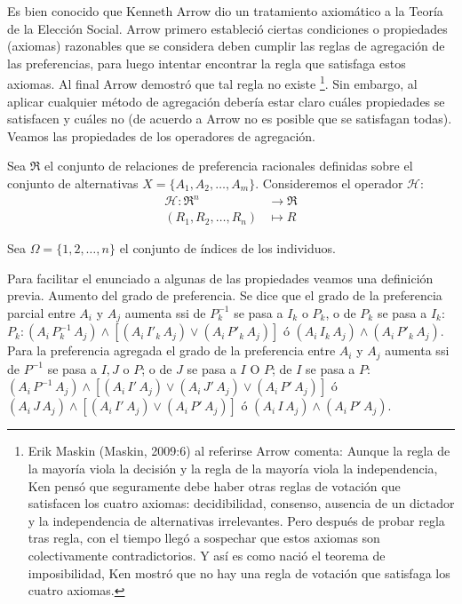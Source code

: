 \documentclass[a5paper,doc,10pt,noapacite]{apa6}
\begin{document}
{{Es bien conocido que Kenneth Arrow dio un tratamiento axiomático a la Teoría de la Elección Social. Arrow primero estableció ciertas condiciones o propiedades (axiomas) razonables que se considera deben cumplir las reglas de agregación de las preferencias, para luego intentar encontrar la regla que satisfaga estos axiomas. Al final Arrow demostró que tal regla no existe \footnote{Erik Maskin (Maskin, 2009:6) al referirse Arrow comenta: Aunque la regla de la mayoría viola la decisión y la regla de la mayoría viola la independencia, Ken pensó que seguramente debe haber otras reglas de votación que satisfacen los cuatro axiomas: decidibilidad, consenso, ausencia de un dictador y la independencia de alternativas irrelevantes. Pero después de probar regla tras regla, con el tiempo llegó a sospechar que estos axiomas son colectivamente contradictorios. Y así es como nació el teorema de imposibilidad, Ken mostró que no hay una regla de votación que satisfaga los cuatro axiomas.}. Sin embargo, al aplicar cualquier método de agregación debería estar claro cuáles propiedades se satisfacen y cuáles no (de acuerdo a Arrow no es posible que se satisfagan todas). Veamos las propiedades de los operadores de agregación.

\vspace{1\baselineskip}
Sea \(\Re\) el conjunto de relaciones de preferencia racionales definidas sobre el conjunto de alternativas \(X = \{A_1,A_2,\dots, A_m\}\). Consideremos el operador \(\mathcal{H}\):
\begin{align*}
\mathcal{H}: \Re ^n & \rightarrow \Re \\
(R_1, R_2, \dots , R_n) & \mapsto R
\end{align*}


Sea \(\Omega = \{1,2,\dots, n\}\) el conjunto de índices de los individuos.

\vspace{1\baselineskip}
Para facilitar el enunciado a algunas de las propiedades veamos una definición previa.
Aumento del grado de preferencia. Se dice que el grado de la preferencia parcial entre \(A_i\) y \(A_j\) aumenta ssi de \(P_k^{-1}\) se pasa a \(I_k\) o \(P_k\), o de \(P_k\) se pasa a \(I_k\): \(P_k: (A_i \, P_k^{-1} \, A_j) \wedge [(A_i \, I'_k \, A_j) \vee (A_i \, P'_k \, A_j)]\) ó \((A_i \, I_k \, A_j) \wedge (A_i \, P'_k \, A_j)\). Para la preferencia agregada el grado de la preferencia entre \(A_i\) y \(A_j\) aumenta ssi de \(P^{-1}\) se pasa a \(I,J\) o \(P\); o de \(J\) se pasa a \(I\) O \(P\); de \(I\) se pasa a \(P\): \((A_i \, P^{-1} \, A_j) \wedge [(A_i \, I' \, A_j) \vee (A_i \, J' \, A_j) \vee (A_i \, P' \, A_j)]\) ó \((A_i \, J \, A_j) \wedge [(A_i \, I' \, A_j) \vee (A_i \, P' \, A_j)]\) ó \((A_i \, I \, A_j) \wedge (A_i \, P' \, A_j)\).

}}
\end{document}
